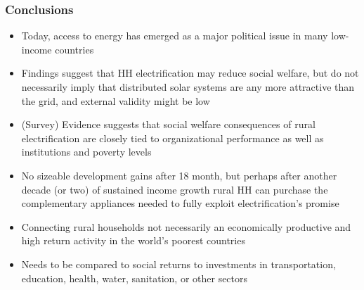 \documentclass[compress]{beamer}
\newenvironment{noheadline}{
    \setbeamertemplate{headline}{}
    \addtobeamertemplate{frametitle}{\vspace*{-0.9\baselineskip}}{}
}{}
\begin{document}
\begin{noheadline}
\begin{frame} \footnotesize
\frametitle{Conclusions}
\begin{itemize}
\item Today, access to energy has emerged as a major political issue in many low-income
countries
\item Findings suggest that HH electrification may reduce
social welfare, but do not necessarily imply that distributed solar systems are any more
attractive than the grid, and external validity might be low
\item (Survey) Evidence suggests that social welfare consequences of rural electrification are
closely tied to organizational performance as well as institutions and poverty levels
\item No sizeable development gains after 18 month, but perhaps after another decade (or two) of sustained income growth rural HH can purchase the complementary appliances needed to fully exploit electrification's promise
\item Connecting rural households not necessarily an economically productive and high return activity in the world's poorest countries
\item Needs to be compared to social returns to investments in transportation, education, health, water, sanitation, or other sectors 
\end{itemize}
\end{frame}
\end{noheadline}
\end{document}
